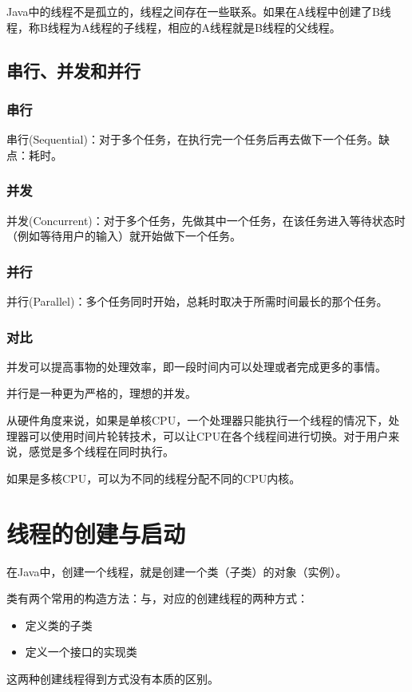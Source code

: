 \documentclass[a4paper]{report}
\begin{document}
Java中的线程不是孤立的，线程之间存在一些联系。如果在A线程中创建了B线程，称B线程为A线程的子线程，相应的A线程就是B线程的父线程。
\subsection{串行、并发和并行}
\subsubsection{串行}
串行(Sequential)：对于多个任务，在执行完一个任务后再去做下一个任务。缺点：耗时。

\subsubsection{并发}

并发(Concurrent)：对于多个任务，先做其中一个任务，在该任务进入等待状态时（例如等待用户的输入）就开始做下一个任务。

\subsubsection{并行}
并行(Parallel)：多个任务同时开始，总耗时取决于所需时间最长的那个任务。
\subsubsection{对比}
并发可以提高事物的处理效率，即一段时间内可以处理或者完成更多的事情。

并行是一种更为严格的，理想的并发。

从硬件角度来说，如果是单核CPU，一个处理器只能执行一个线程的情况下，处理器可以使用时间片轮转技术，可以让CPU在各个线程间进行切换。对于用户来说，感觉是多个线程在同时执行。

如果是多核CPU，可以为不同的线程分配不同的CPU内核。
\section{线程的创建与启动}
在Java中，创建一个线程，就是创建一个类（子类）的对象（实例）。

类有两个常用的构造方法：与，对应的创建线程的两种方式：
\begin{itemize}
  \item 定义类的子类
  \item 定义一个接口的实现类
\end{itemize}
这两种创建线程得到方式没有本质的区别。
\end{document}
